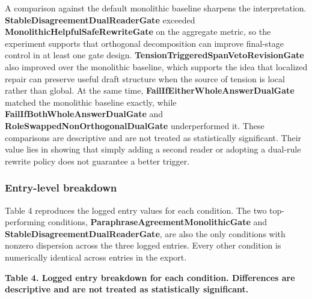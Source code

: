 \documentclass{article}
\begin{document}
A comparison against the default monolithic baseline sharpens the interpretation. \textbf{StableDisagreementDualReaderGate} exceeded \textbf{MonolithicHelpfulSafeRewriteGate} on the aggregate metric, so the experiment supports that orthogonal decomposition can improve final-stage control in at least one gate design. \textbf{TensionTriggeredSpanVetoRevisionGate} also improved over the monolithic baseline, which supports the idea that localized repair can preserve useful draft structure when the source of tension is local rather than global. At the same time, \textbf{FailIfEitherWholeAnswerDualGate} matched the monolithic baseline exactly, while \textbf{FailIfBothWholeAnswerDualGate} and \textbf{RoleSwappedNonOrthogonalDualGate} underperformed it. These comparisons are descriptive and are not treated as statistically significant. Their value lies in showing that simply adding a second reader or adopting a dual-rule rewrite policy does not guarantee a better trigger.

\subsubsection{Entry-level breakdown}

\label{sec:entry_level_breakdown}

Table 4 reproduces the logged entry values for each condition. The two top-performing conditions, \textbf{ParaphraseAgreementMonolithicGate} and \textbf{StableDisagreementDualReaderGate}, are also the only conditions with nonzero dispersion across the three logged entries. Every other condition is numerically identical across entries in the export.

\textbf{Table 4. Logged entry breakdown for each condition. Differences are descriptive and are not treated as statistically significant.}
\end{document}
